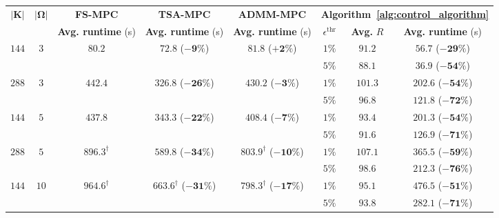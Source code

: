 \documentclass[a4paper,fleqn]{cas-sc}
\begin{document}
\begin{table}
\centering
\renewcommand{\arraystretch}{1}
\begin{tabular}{cccccccc}
\hline
\multirow{2}{*}{\textbf{$|\boldsymbol{K}|$}}
& \multirow{2}{*}{\textbf{$|\boldsymbol{\Omega}|$}}
& \textbf{FS-MPC}
& \textbf{TSA-MPC}
& \textbf{ADMM-MPC}
& \multicolumn{3}{c}{\textbf{Algorithm~\ref{alg:control_algorithm}}}\\
&
& \textbf{Avg. runtime} (s)
& \textbf{Avg. runtime} (s)
& \textbf{Avg. runtime} (s)
& $\epsilon^{\mathrm{thr}}$
& \textbf{Avg.} $R$
& \textbf{Avg. runtime} (s) \\
\hline

\multirow{2}{*}{$144$}
& \multirow{2}{*}{$3$}
& \multirow{2}{*}{$80.2$}
& \multirow{2}{*}{$72.8$ ($\boldsymbol{-9\%}$)}
& \multirow{2}{*}{$81.8$ ($\boldsymbol{+2\%}$)}
& $1\%$
& $91.2$
& $56.7$ ($\boldsymbol{-29\%}$) \\
& & & &
& $5\%$
& $88.1$
& $36.9$ ($\boldsymbol{-54\%}$) \\

\multirow{2}{*}{$288$}
& \multirow{2}{*}{$3$}
& \multirow{2}{*}{$442.4$}
& \multirow{2}{*}{$326.8$ ($\boldsymbol{-26\%}$)}
& \multirow{2}{*}{$430.2$ ($\boldsymbol{-3\%}$)}
& $1\%$
& $101.3$
& $202.6$ ($\boldsymbol{-54\%}$) \\
& & & &
& $5\%$
& $96.8$
& $121.8$ ($\boldsymbol{-72\%}$) \\

\multirow{2}{*}{$144$}
& \multirow{2}{*}{$5$}
& \multirow{2}{*}{$437.8$}
& \multirow{2}{*}{$343.3$ ($\boldsymbol{-22\%}$)}
& \multirow{2}{*}{$408.4$ ($\boldsymbol{-7\%}$)}
& $1\%$
& $93.4$
& $201.3$ ($\boldsymbol{-54\%}$) \\
& & & &
& $5\%$
& $91.6$
& $126.9$ ($\boldsymbol{-71\%}$) \\

\multirow{2}{*}{$288$}
& \multirow{2}{*}{$5$}
& \multirow{2}{*}{$896.3^{\dagger}$}
& \multirow{2}{*}{$589.8$ ($\boldsymbol{-34\%}$)}
& \multirow{2}{*}{$803.9^{\dagger}$ ($\boldsymbol{-10\%}$)}
& $1\%$
& $107.1$
& $365.5$ ($\boldsymbol{-59\%}$) \\
& & & &
& $5\%$
& $98.6$
& $212.3$ ($\boldsymbol{-76\%}$) \\

\multirow{2}{*}{$144$}
& \multirow{2}{*}{$10$}
& \multirow{2}{*}{$964.6^{\dagger}$}
& \multirow{2}{*}{$663.6^{\dagger}$ ($\boldsymbol{-31\%}$)}
& \multirow{2}{*}{$798.3^{\dagger}$ ($\boldsymbol{-17\%}$)}
& $1\%$
& $95.1$
& $476.5$ ($\boldsymbol{-51\%}$) \\
& & & &
& $5\%$
& $93.8$
& $282.1$ ($\boldsymbol{-71\%}$) \\


\end{tabular}
\end{table}
\end{document}
